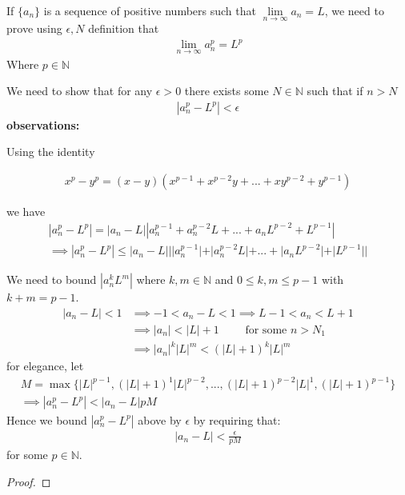 \documentclass[12pt]{book}
\theoremstyle{definition}
\begin{document}
\noindent
If $\{a_n\}$ is a sequence of positive numbers such that $\lim\limits_{n \to \infty}a_n =L$, we need to prove using $\epsilon, N$ definition that
\begin{align*}
\lim\limits_{n \to \infty}a_n^p = L^p
\end{align*} Where $p \in \mathbb{N}$

\begin{sol}
	



We need to show that for any $\epsilon >0$ there exists some $N \in \mathbb{N}$ such that if $n>N$ 
\begin{align*}
|a_n^p-L^p| < \epsilon
\end{align*}
\noindent
\textbf{observations:}

\noindent
Using the identity

\begin{align*}
x^p-y^p = (x-y)(x^{p-1}+x^{p-2}y+...+xy^{p-2}+y^{p-1})
\end{align*}

\noindent 
we have
\begin{align*}
	|a_n^p -L^p| = |a_n-L||a_n^{p-1}+a_n^{p-2}L+...+a_nL^{p-2}+L^{p-1}|\\
\implies |a_n^p -L^p| \leq |a_n-L|||a_n^{p-1}|+|a_n^{p-2}L|+...+|a_nL^{p-2}|+|L^{p-1}||
\end{align*}

\noindent 
We need to bound $|a_n^kL^m|$ where $k,m \in \mathbb{N}$ and $0\leq k,m \leq p-1$ with $k+m =p-1$.
\begin{align*}
|a_n-L| <1 &\implies -1 < a_n-L<1 \implies L-1<a_n<L+1\\
&\implies |a_n| < |L|+1 \qquad \text{ for some } n > N_1\\
&\implies |a_n|^k |L|^m <(|L|+1)^k|L|^m
\end{align*}
for elegance, let
\begin{align*}
	M = \max\{|L|^{p-1},(|L|+1)^1|L|^{p-2},...,(|L|+1)^{p-2}|L|^{1},(|L|+1)^{p-1}\}\\
	\implies 
|a_n^p -L^p| < |a_n-L|pM
\end{align*}
Hence we bound $|a_n^p-L^p|$ above by $\epsilon$ by requiring that:
\begin{align*}
|a_n-L| < \frac{\epsilon}{pM}
\end{align*}
for some $p \in \mathbb{N}$.

\begin{proof}





\end{proof}
\end{sol}
\end{document}
